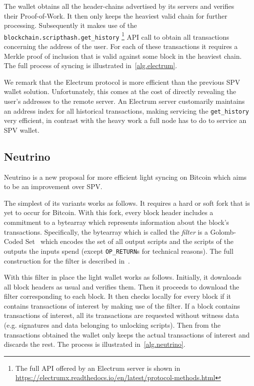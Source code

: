 The wallet obtains all the header-chains advertised by its servers and verifies their Proof-of-Work. It then only keeps the heaviest valid chain for further processing. Subsequently it makes use of the \texttt{block\-chain.\allowbreak script\-hash.\allowbreak get\_history}
\footnote{The full API offered by an Electrum server is shown in \url{https://electrumx.readthedocs.io/en/latest/protocol-methods.html}}
API call to obtain all transactions concerning the address of the user. For each of these transactions it requires a Merkle proof of inclusion that is valid against some block in the heaviest chain. The full process of syncing is illustrated in~\cref{alg.electrum}.

We remark that the Electrum protocol is more efficient than the previous SPV wallet solution. Unfortunately, this comes at the cost of directly revealing the user's addresses to the remote server. An Electrum server customarily maintains an address index for all historical transactions, making servicing the \texttt{get\_history} very efficient, in contrast with the heavy work a full node has to do to service an SPV wallet.



\subsection{Neutrino}
Neutrino is a new proposal for more efficient light syncing on Bitcoin which aims to be an improvement over SPV.

The simplest of its variants works as follows. It requires a hard or soft fork that is yet to occur for Bitcoin. With this fork, every block header includes a commitment to a bytearray which represents information about the block's transactions. Specifically, the bytearray which is called the \emph{filter} is a Golomb-Coded Set~\cite{golomb1966run}
which encodes the set of all output scripts and the scripts of the outputs the inputs spend (except \texttt{OP\_RETURN}s for technical reasons). The full construction for the filter is described in~\cite{bip158}.

With this filter in place the light wallet works as follows. Initially, it downloads all block headers as usual and verifies them. Then it proceeds to download the filter corresponding to each block. It then checks locally for every block if it contains transactions of interest by making use of the filter. If a block contains transactions of interest, all its transactions are requested without witness data (e.g. signatures and data belonging to unlocking scripts). Then from the transactions obtained the wallet only keeps the actual transactions of interest and discards the rest. The process is illustrated in~\cref{alg.neutrino}.

